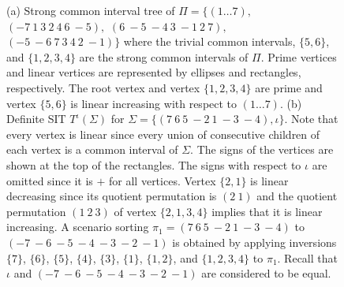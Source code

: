 \documentclass{svmult}
\begin{document}
\begin{figure}
		\begin{center}
			\label{subfi:SIT_def_definit_a}\quad
		\end{center}
	\caption{(a) Strong common interval tree of $\Pi=\{(1 \ldots 7),$ 
	$(-{7}~1~3~2~4~6~-{5}),$ $(6~-{5}~-{4}~3~-{1}~2~7),$
	$(-{5}~-{6}~7~3~4~2~-{1})\}$ where the trivial common
	intervals, $\{5,6\}$, and $\{1,2,3,4\}$ are
	the strong common intervals of $\Pi$. Prime vertices and linear vertices are represented 
	by ellipses and rectangles, respectively. The root vertex and vertex $\{1,2,3,4\}$ are prime and vertex $\{5,6\}$ is 
	linear increasing with respect to $(1 \ldots 7)$.
	(b) Definite SIT ${T}^\iota(\Sigma)$ for
	$\Sigma=\{(7~6~5~-{2}~1~-{3}~-{4}), \iota\}$. Note that every vertex is
	linear since every union of consecutive children of each vertex is a common
	interval of $\Sigma$. The signs of the vertices are shown at the top of the
	rectangles. The signs with respect to $\iota$ are omitted since it is $+$
	for all vertices. Vertex $\{2,1\}$ is linear decreasing since its quotient
	permutation is $(2~1)$ and the quotient permutation $(1~2~3)$ of vertex
	$\{2,1,3,4\}$ implies that it is linear increasing. A scenario sorting
	$\pi_1=(7~6~5~-{2}~1~-{3}~-{4})$ to
	$(-{7}~-{6}~-{5}~-{4}~-{3}~-{2}~-{1})$ is obtained by
	applying inversions $\{7\}$, $\{6\}$, $\{5\}$, $\{4\}$, $\{3\}$, $\{1\}$,
	$\{1,2\}$, and $\{1,2,3,4\}$ to $\pi_1$.
	Recall that $\iota$ and $(-{7}~-{6}~-{5}~-{4}~-{3}~-{2}~-{1})$ are
	considered to be equal.}
	\label{fig:SIT_def_definit}
\end{figure}
\end{document}
